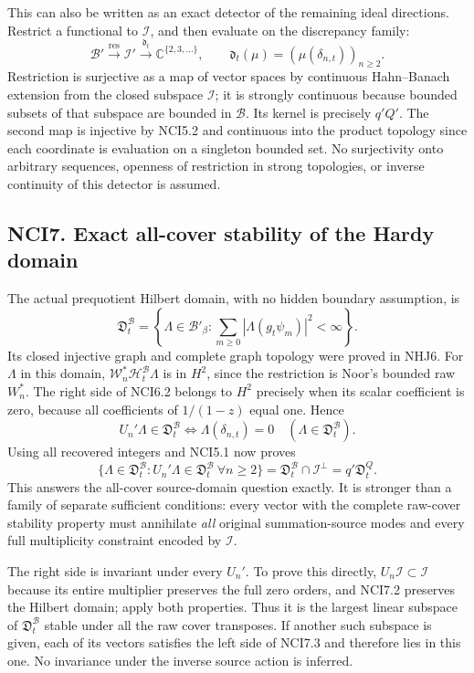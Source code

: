 This can also be written as an exact detector of the remaining ideal
directions. Restrict a functional to \(\mathcal I\), and then evaluate
on the discrepancy family: \[
\mathcal B'\xrightarrow{\mathrm{res}}\mathcal I'
\xrightarrow{\mathfrak d_t}\mathbb C^{\{2,3,\ldots\}},
\qquad\mathfrak d_t(\mu)=(\mu(\delta_{n,t}))_{n\ge2}.
\tag{NCI6.4}
\] Restriction is surjective as a map of vector spaces by continuous
Hahn--Banach extension from the closed subspace \(\mathcal I\); it is
strongly continuous because bounded subsets of that subspace are bounded
in \(\mathcal B\). Its kernel is precisely \(q'Q'\). The second map is
injective by NCI5.2 and continuous into the product topology since each
coordinate is evaluation on a singleton bounded set. No surjectivity
onto arbitrary sequences, openness of restriction in strong topologies,
or inverse continuity of this detector is assumed.

\subsection{NCI7. Exact all-cover stability of the Hardy
domain}\label{nci7.-exact-all-cover-stability-of-the-hardy-domain}

The actual prequotient Hilbert domain, with no hidden boundary
assumption, is \[
\mathfrak D_t^{\mathcal B}
=\left\{\Lambda\in\mathcal B'_\beta:
\sum_{m\ge0}|\Lambda(g_t\psi_m)|^2<\infty\right\}.
\tag{NCI7.1}
\] Its closed injective graph and complete graph topology were proved in
NHJ6. For \(\Lambda\) in this domain,
\(\mathscr W_n^*\mathcal H_t^{\mathcal B}\Lambda\) is in \(H^2\), since
the restriction is Noor's bounded raw \(W_n^*\). The right side of
NCI6.2 belongs to \(H^2\) precisely when its scalar coefficient is zero,
because all coefficients of \(1/(1-z)\) equal one. Hence \[
U_n'\Lambda\in\mathfrak D_t^{\mathcal B}
\iff\Lambda(\delta_{n,t})=0
\quad(\Lambda\in\mathfrak D_t^{\mathcal B}).
\tag{NCI7.2}
\] Using all recovered integers and NCI5.1 now proves \[
\boxed{
\{\Lambda\in\mathfrak D_t^{\mathcal B}:
U_n'\Lambda\in\mathfrak D_t^{\mathcal B}\ \forall n\ge2\}
=\mathfrak D_t^{\mathcal B}\cap\mathcal I^\perp
=q'\mathfrak D_t^Q.}
\tag{NCI7.3}
\] This answers the all-cover source-domain question exactly. It is
stronger than a family of separate sufficient conditions: every vector
with the complete raw-cover stability property must annihilate
\emph{all} original summation-source modes and every full multiplicity
constraint encoded by \(\mathcal I\).

The right side is invariant under every \(U_n'\). To prove this
directly, \(U_n\mathcal I\subset\mathcal I\) because its entire
multiplier preserves the full zero orders, and NCI7.2 preserves the
Hilbert domain; apply both properties. Thus it is the largest linear
subspace of \(\mathfrak D_t^{\mathcal B}\) stable under all the raw
cover transposes. If another such subspace is given, each of its vectors
satisfies the left side of NCI7.3 and therefore lies in this one. No
invariance under the inverse source action is inferred.

